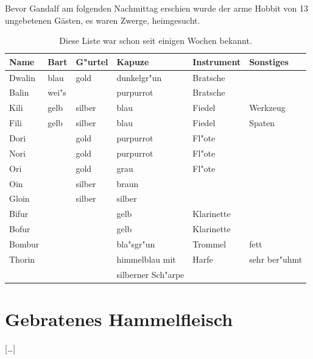 \documentclass[a4paper]{article}
\begin{document}
Bevor Gandalf am folgenden Nachmittag erschien wurde der arme Hobbit
von 13 ungebetenen G\"asten, es waren Zwerge, heimgesucht.
%
\begin{table}
\begin{center}
\begin{tabular}{l||l|l|l|l|l}
Name & Bart & G"urtel & Kapuze & Instrument & Sonstiges \\\hline
Dwalin & blau & gold & dunkelgr"un & Bratsche & \\
Balin & wei"s & & purpurrot & Bratsche & \\
Kili & gelb & silber & blau & Fiedel & Werkzeug \\
Fili & gelb & silber & blau & Fiedel & Spaten \\
Dori & & gold & purpurrot & Fl"ote & \\
Nori & & gold & purpurrot & Fl"ote & \\
Ori & & gold & grau & Fl"ote & \\
Oin & & silber & braun & & \\
Gloin & & silber & silber & & \\
Bifur & & & gelb & Klarinette & \\
Bofur & & & gelb & Klarinette & \\
Bombur & & & bla"sgr"un & Trommel & fett \\
Thorin & & & himmelblau mit & Harfe & sehr ber"uhmt \\
 & & & silberner Sch"arpe & &
\end{tabular}
\caption{Diese Liste war schon seit einigen Wochen bekannt.}
\label{602c20fc-040b-4292-aea0-d2c393222937}
\end{center}

\end{table}
%
\section{Gebratenes Hammelfleisch}
[\dots]
\end{document}
